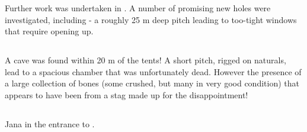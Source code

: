 Further work was undertaken in . A number of promising new
holes were investigated, including  - a roughly 25 m deep
pitch leading to too-tight windows that require opening up.

\subsection{\protect{}}

A cave was found within 20 m of the tents! A short pitch, rigged on
naturals, lead to a spacious chamber that was unfortunately dead.
However the presence of a large collection of bones (some crushed, but
many in very good condition) that appears to have been from a stag made
up for the disappointment!

\subsection{\protect{}}

\begin{marginfigure}
\caption{Jana in the entrance to . }
\end{marginfigure}

